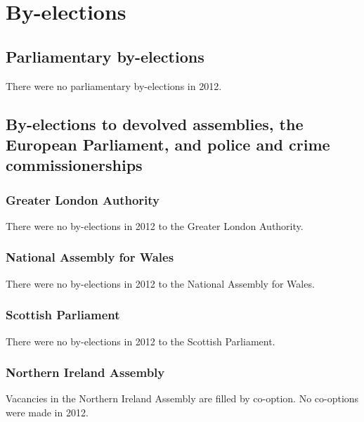 \documentclass[a4paper,openany]{book}
\begin{document}
\part{By-elections}

\chapter{Parliamentary by-elections}

There were no parliamentary by-elections in 2012.

\chapter{By-elections to devolved assemblies, the European Parliament, and police and crime commissionerships}

\section{Greater London Authority}

There were no by-elections in 2012 to the Greater London Authority.

\section{National Assembly for Wales}

There were no by-elections in 2012 to the National Assembly for Wales.

\section{Scottish Parliament}

There were no by-elections in 2012 to the Scottish Parliament.

\section{Northern Ireland Assembly}

Vacancies in the Northern Ireland Assembly are filled by co-option.  No co-options were made in 2012.

\end{document}
